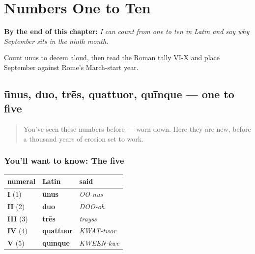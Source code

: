 
\chapter{Numbers One to Ten}
\label{ch:la-numbers-one-to-ten}

\begin{chapteropening}
\textbf{By the end of this chapter:} \emph{I can count from one to ten in Latin and say why September sits in the ninth month.}

Count ūnus to decem aloud, then read the Roman tally VI-X and place September against Rome's March-start year.
\end{chapteropening}

\section[ūnus duo trēs quattuor quīnque]{ūnus, duo, trēs, quattuor, quīnque — one to five}

\label{lesson:LA-C02-numbers-1-5}



\begin{quote}
You've seen these numbers before — worn down. Here they are new, before a thousand years of erosion set to work.
\end{quote}

\subsection*{You'll want to know: The five}
\noindent
\begin{tabularx}{\linewidth}{@{}>{\raggedright\arraybackslash}X>{\raggedright\arraybackslash}X>{\raggedright\arraybackslash}X@{}}
\toprule
\textbf{numeral} & \textbf{Latin} & \textbf{said} \\
\midrule
\textbf{I} (1) & \textbf{ūnus} & \emph{OO-nus} \\
\textbf{II} (2) & \textbf{duo} & \emph{DOO-oh} \\
\textbf{III} (3) & \textbf{trēs} & \emph{trayss} \\
\textbf{IV} (4) & \textbf{quattuor} & \emph{KWAT-twor} \\
\textbf{V} (5) & \textbf{quīnque} & \emph{KWEEN-kwe} \\
\bottomrule
\end{tabularx}

